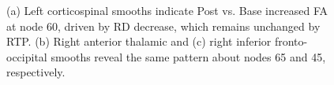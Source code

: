 \documentclass[12pt]{article}
\begin{document}
\begin{figure}[H]
	\caption{(a) Left corticospinal smooths indicate Post vs. Base increased FA at node 60, driven by RD decrease, which remains unchanged by RTP. (b) Right anterior thalamic and (c) right inferior fronto-occipital smooths reveal the same pattern about nodes 65 and 45, respectively.}
	\label{supp-fig:lgio-gam-norecov}
\end{figure}
\end{document}
